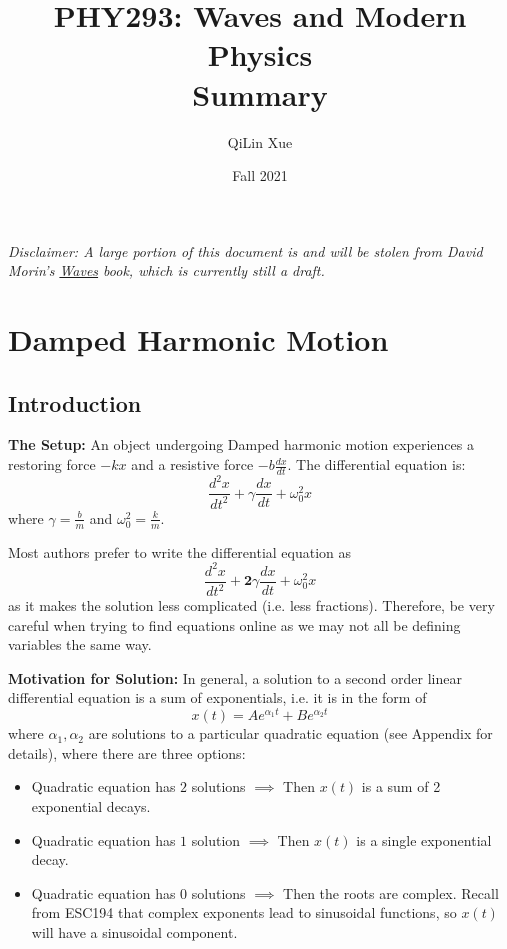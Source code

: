 \documentclass{article}
\title{PHY293: Waves and Modern Physics \\ \textbf{Summary}}
\author{QiLin Xue}
\date{Fall 2021}
\begin{document}
\maketitle
\textit{Disclaimer: A large portion of this document is and will be stolen from David Morin's \href{https://scholar.harvard.edu/david-morin/waves}{Waves} book, which is currently still a draft.}

\tableofcontents
\newpage

\section{Damped Harmonic Motion}
\subsection{Introduction}
\textbf{The Setup:} An object undergoing Damped harmonic motion experiences a restoring force $-kx$ and a resistive force $-b \frac{dx}{dt}$. The differential equation is: 
\begin{equation}
    \frac{d^2x}{dt^2} + \gamma \frac{dx}{dt} + \omega_0^2 x
\end{equation}
where $\gamma = \frac{b}{m}$ and $\omega_0^2 = \frac{k}{m}.$
\begin{warning}
    Most authors prefer to write the differential equation as 
    \begin{equation*}
        \frac{d^2x}{dt^2} + \mathbf{2}\gamma \frac{dx}{dt} + \omega_0^2 x
    \end{equation*}
    as it makes the solution less complicated (i.e. less fractions). Therefore, be very careful when trying to find equations online as we may not all be defining variables the same way.
\end{warning}
\textbf{Motivation for Solution:} In general, a solution to a second order linear differential equation is a sum of exponentials, i.e. it is in the form of 
\begin{equation*}
    x(t) = Ae^{\alpha_1 t} + Be^{\alpha_2 t}
\end{equation*}
where $\alpha_1,\alpha_2$ are solutions to a particular quadratic equation (see Appendix for details), where there are three options: 
\begin{itemize}
    \item Quadratic equation has $2$ solutions $\implies$ Then $x(t)$ is a sum of 2 exponential decays.
    \item Quadratic equation has $1$ solution $\implies$ Then $x(t)$ is a single exponential decay.
    \item Quadratic equation has $0$ solutions $\implies$ Then the roots are complex. Recall from ESC194 that complex exponents lead to sinusoidal functions, so $x(t)$ will have a sinusoidal component. 
\end{itemize}
\end{document}
